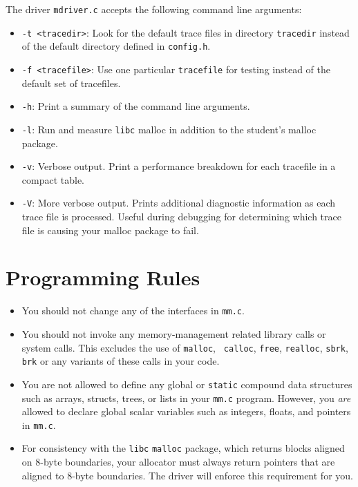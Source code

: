\documentclass[11pt]{article}
\begin{document}
The driver {\tt mdriver.c} accepts the following command line arguments:
\begin{itemize}

\item {\tt -t <tracedir>}:
Look for the default trace files in directory {\tt tracedir} 
instead of the default directory defined in {\tt config.h}.

\item {\tt -f <tracefile>}:  
Use one particular {\tt tracefile} for testing instead of the 
default set of tracefiles.

\item {\tt -h}:
Print a summary of the command line arguments.

\item {\tt -l}:
Run and measure {\tt libc} malloc in addition to the student's malloc package.

\item {\tt -v}:  
Verbose output. Print a performance breakdown for each tracefile
in a compact table.

\item {\tt -V}: 
More verbose output. Prints additional diagnostic information as each
trace file is processed.  Useful during debugging for determining
which trace file is causing your malloc package to fail.

\end{itemize}


\section{Programming Rules}
\begin{itemize}
\item You should not change any of the interfaces in {\tt mm.c}.

\item You should not invoke any memory-management related library
calls or system calls.  This excludes the use of {\tt malloc}, {\tt
calloc}, {\tt free}, {\tt realloc}, {\tt sbrk}, {\tt brk} or any
variants of these calls in your code.

\item 
You are not allowed to define any global or {\tt static} compound data
structures such as arrays, structs, trees, or lists in your {\tt mm.c}
program.  However, you {\em are} allowed to declare global scalar variables
such as integers, floats, and pointers in {\tt mm.c}. 

\item
For consistency with the {\tt libc} {\tt malloc} package, which
returns blocks aligned on 8-byte boundaries, your allocator must
always return pointers that are aligned to 8-byte boundaries.  The
driver will enforce this requirement for you.

\end{itemize}
\end{document}

